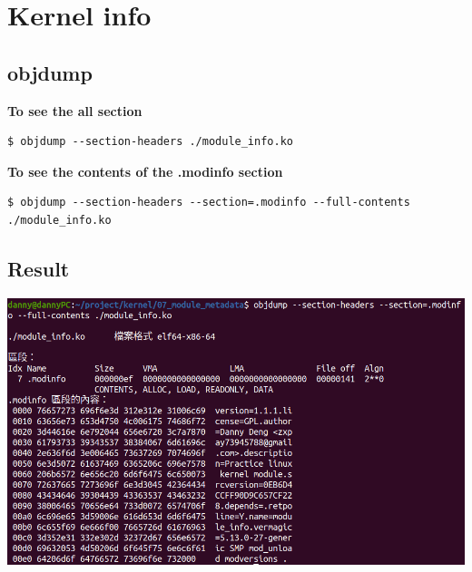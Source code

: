 \section{Kernel info}

\subsection{objdump}


\textbf{To see the all section}
\begin{lstlisting}[style=CStyle]
    $ objdump --section-headers ./module_info.ko
\end{lstlisting}


\textbf{To see the contents of the .modinfo section}
\begin{lstlisting}[style=CStyle]
    $ objdump --section-headers --section=.modinfo --full-contents ./module_info.ko
\end{lstlisting}


\subsection{Result}
\begin{center}
    \includegraphics[width=\linewidth]{images/07_objdump.png}
\end{center}


